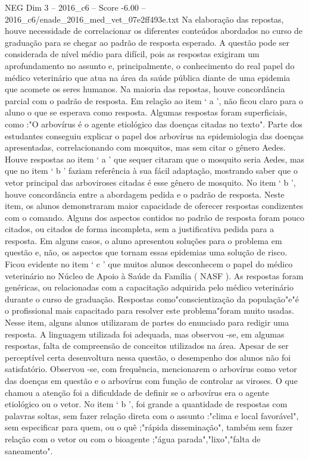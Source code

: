 \begin{textsample}{NEG Dim 3 – 2016\_c6 – Score -6.00 – 2016\_c6/enade\_2016\_med\_vet\_07e2ff493e.txt}
Na elaboração das repostas, houve necessidade de correlacionar os diferentes conteúdos abordados no curso de graduação para se chegar ao padrão de resposta esperado.
A questão pode ser considerada de nível médio para difícil, pois as respostas exigiram um aprofundamento no assunto e, principalmente, o conhecimento do real papel do médico veterinário que atua na área da saúde pública diante de uma epidemia que acomete os seres humanos.
Na maioria das repostas, houve concordância parcial com o padrão de resposta.
Em relação ao item ‘ a ’, não ficou claro para o aluno o que se esperava como resposta.
Algumas respostas foram superficiais, como :"O arbovírus é o agente etiológico das doenças citadas no texto".
Parte dos estudantes conseguiu explicar o papel dos arbovírus na epidemiologia das doenças apresentadas, correlacionando com mosquitos, mas sem citar o gênero Aedes.
Houve respostas ao item ‘ a ’ que sequer citaram que o mosquito seria Aedes, mas que no item ‘ b ’ faziam referência à sua fácil adaptação, mostrando saber que o vetor principal das arboviroses citadas é esse gênero de mosquito.
No item ‘ b ’, houve concordância entre a abordagem pedida e o padrão de resposta.
Neste item, os alunos demonstraram maior capacidade de oferecer respostas condizentes com o comando.
Alguns dos aspectos contidos no padrão de resposta foram pouco citados, ou citados de forma incompleta, sem a justificativa pedida para a resposta.
Em alguns casos, o aluno apresentou soluções para o problema em questão e, não, os aspectos que tornam essas epidemias uma solução de risco.
Ficou evidente no item ‘ c ’ que muitos alunos desconhecem o papel do médico veterinário no Núcleo de Apoio à Saúde da Família ( NASF ).
As respostas foram genéricas, ou relacionadas com a capacitação adquirida pelo médico veterinário durante o curso de graduação.
Respostas como"conscientização da população"e"é o profissional mais capacitado para resolver este problema"foram muito usadas.
Nesse item, alguns alunos utilizaram de partes do enunciado para redigir uma resposta.
A linguagem utilizada foi adequada, mas observou -se, em algumas respostas, falta de compreensão de conceitos utilizados na área.
Apesar de ser perceptível certa desenvoltura nessa questão, o desempenho dos alunos não foi satisfatório.
Observou -se, com frequência, mencionarem o arbovírus como vetor das doenças em questão e o arbovírus com função de controlar as viroses.
O que chamou a atenção foi a dificuldade de definir se o arbovírus era o agente etiológico ou o vetor.
No item ‘ b ’, foi grande a quantidade de respostas com palavras soltas, sem fazer relação direta com o assunto :"clima e local favorável", sem especificar para quem, ou o quê ;"rápida disseminação", também sem fazer relação com o vetor ou com o bioagente ;"água parada","lixo","falta de saneamento".

\end{textsample}
